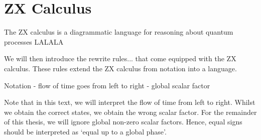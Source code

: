 \chapter{\label{zx-calculus}ZX Calculus}

The ZX calculus is a diagrammatic language for reasoning about quantum processes LALALA

We will then introduce the rewrite rules... that come equipped with the ZX calculus. These rules extend the ZX calculus from notation into a language.

Notation
- flow of time goes from left to right
- global scalar factor


Note that in this text, we will interpret the flow of time from left to right.
Whilst we obtain the correct states, we obtain the wrong scalar factor. For the remainder of this thesis, we will ignore global non-zero scalar factors. Hence, equal signs should be interpreted as `equal up to a global phase'.

